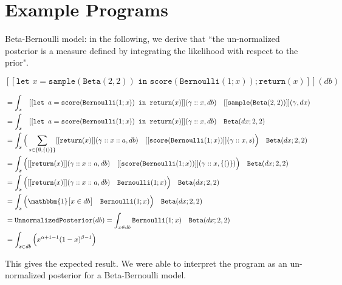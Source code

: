 \documentclass[11pt]{article}
\theoremstyle{definition}
\theoremstyle{plain}
\begin{document}
\newpage

\section{Example Programs}


\noindent Beta-Bernoulli model: in the following, we derive that ``the un-normalized posterior is a measure defined by integrating the likelihood with respect to the prior".

    $$[[\texttt{let } x = \texttt{sample}(\texttt{Beta}(2,2)) \texttt{ in score} (\texttt{Bernoulli}(1;x));\texttt{return}(x)]](db)$$

\begin{align*}
    &= \int_x \quad [[\texttt{let } a =\texttt{score}(\texttt{Bernoulli}(1;x)) \texttt{ in return}(x)]](\gamma::x, db) 
        \quad [[\texttt{sample}(\texttt{Beta}(2,2))]](\gamma,dx)\\
    &= \int_x \quad [[\texttt{let } a =\texttt{score}(\texttt{Bernoulli}(1;x)) \texttt{ in return}(x)]](\gamma::x, db) 
        \quad \texttt{Beta}(dx;2,2)\\
    &= \int_x 
        \Big( \sum_{s \in \{\emptyset,\{()\} \}} [[\texttt{return}(x)]](\gamma::x::a,db) \quad [[\texttt{score}(\texttt{Bernoulli}(1;x))]](\gamma::x,s) \Big)
        \quad \texttt{Beta}(dx;2,2)\\
    &= \int_x 
        \Big( [[\texttt{return}(x)]](\gamma::x::a,db) \quad [[\texttt{score}(\texttt{Bernoulli}(1;x))]](\gamma::x,\{()\}) \Big)
        \quad \texttt{Beta}(dx;2,2)\\
    &= \int_x 
        \Big( [[\texttt{return}(x)]](\gamma::x::a,db) \quad \texttt{Bernoulli}(1;x) \Big)
        \quad \texttt{Beta}(dx;2,2)\\
    &= \int_x 
        \Big(\mathbbm{1}\big[ x \in db \big] \quad \texttt{Bernoulli}(1;x) \Big)
        \quad \texttt{Beta}(dx;2,2)\\
    &= \texttt{UnnormalizedPosterior}(db) = \int_{x \in db} 
        \texttt{Bernoulli}(1;x) \quad \texttt{Beta}(dx;2,2)\\
    &= \int_{x \in db} \Big(x^{\alpha + 1 - 1}(1-x)^{\beta - 1}\Big)
    \end{align*}

\noindent This gives the expected result. We were able to interpret the program as an un-normalized posterior for a Beta-Bernoulli model.\\
\end{document}
